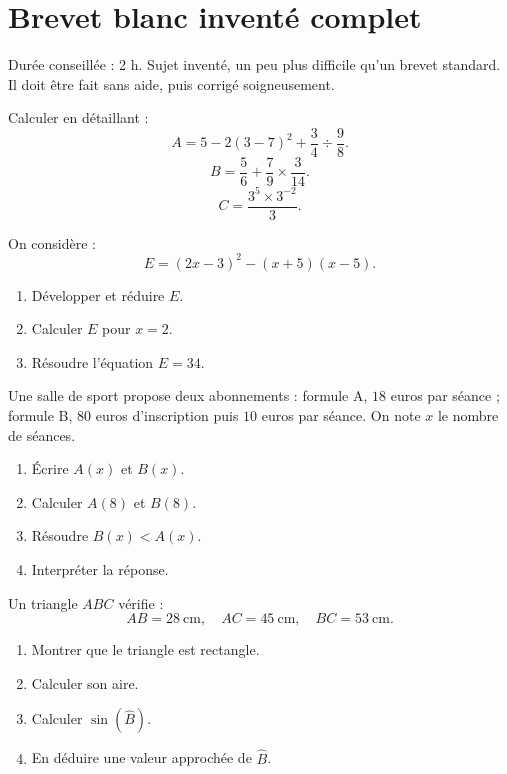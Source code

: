 \documentclass[11pt,a4paper]{article}
\newcounter{exercice}
\begin{document}
\section{Brevet blanc inventé complet}

\begin{objectif}
Durée conseillée : 2 h. Sujet inventé, un peu plus difficile qu'un brevet standard. Il doit être fait sans aide, puis corrigé soigneusement.
\end{objectif}

\begin{exercice}
Calculer en détaillant :
\[
A=5-2(3-7)^2+\frac{3}{4}\div\frac{9}{8}.
\]
\[
B=\frac{5}{6}+\frac{7}{9}\times\frac{3}{14}.
\]
\[
C=\frac{3^5\times3^{-2}}{3}.
\]
\end{exercice}

\begin{exercice}
On considère :
\[
E=(2x-3)^2-(x+5)(x-5).
\]
\begin{enumerate}
  \item Développer et réduire $E$.
  \item Calculer $E$ pour $x=2$.
  \item Résoudre l'équation $E=34$.
\end{enumerate}
\end{exercice}

\begin{exercice}
Une salle de sport propose deux abonnements : formule A, $18$ euros par séance ; formule B, $80$ euros d'inscription puis $10$ euros par séance. On note $x$ le nombre de séances.
\begin{enumerate}
  \item Écrire $A(x)$ et $B(x)$.
  \item Calculer $A(8)$ et $B(8)$.
  \item Résoudre $B(x)<A(x)$.
  \item Interpréter la réponse.
\end{enumerate}
\end{exercice}

\begin{exercice}
Un triangle $ABC$ vérifie :
\[
AB=28\ \mathrm{cm},\quad AC=45\ \mathrm{cm},\quad BC=53\ \mathrm{cm}.
\]
\begin{enumerate}
  \item Montrer que le triangle est rectangle.
  \item Calculer son aire.
  \item Calculer $\sin(\widehat{B})$.
  \item En déduire une valeur approchée de $\widehat{B}$.
\end{enumerate}
\end{exercice}
\end{document}
